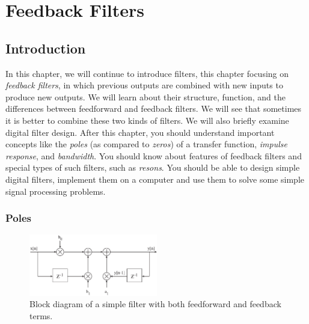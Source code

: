 
%
%
%
%
%
%
%

\chapter{Feedback Filters}
\label{ch:fb-filters}

\section{Introduction}

In this chapter, we will continue to introduce filters, this chapter
focusing on \emph{feedback filters}, in which previous outputs are
combined with new inputs to produce new outputs. We will learn about
their structure, function, and the differences between feedforward and
feedback filters.  We will see that sometimes it is better to combine
these two kinds of filters. We will also briefly examine digital
filter design. After this chapter, you should understand important
concepts like the \emph{poles} (as compared to \emph{zeros}) of a
transfer function, \emph{impulse response}, and \emph{bandwidth}. You
should know about features of feedback filters and special types of
such filters, such as \emph{resons}.  You should be able to design
simple digital filters, implement them on a computer and use them to
solve some simple signal processing problems.

\subsection{Poles}

\begin{figure}
\centerline{\includegraphics[width=0.5\textwidth]{ch-iir/fb-bdiag}}
\caption{Block diagram of a simple filter with both feedforward and
  feedback terms.\label{fig:fb-bdiag}}
\end{figure}

